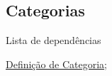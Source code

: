 \subsection{Categorias}
\label{categorias-ex}
\begin{titlemize}{Lista de dependências}
	\item \hyperref[categorias-def]{Definição de Categoria};\\ %

\end{titlemize}

